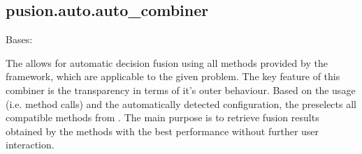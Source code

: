 \documentclass[letterpaper,10pt,english]{sphinxmanual}
\begin{document}
\subsection{pusion.auto.auto\_combiner}
\label{\detokenize{pusion.auto.auto_combiner:module-pusion.auto.auto_combiner}}\label{\detokenize{pusion.auto.auto_combiner:pusion-auto-auto-combiner}}\label{\detokenize{pusion.auto.auto_combiner:ac-cref}}\label{\detokenize{pusion.auto.auto_combiner::doc}}

\begin{fulllineitems}
\label{\detokenize{pusion.auto.auto_combiner:pusion.auto.auto_combiner.AutoCombiner}}
\sphinxAtStartPar
Bases: {\hyperref[\detokenize{pusion.auto.generic_combiner:pusion.auto.generic_combiner.GenericCombiner}]{}}

\sphinxAtStartPar
The  allows for automatic decision fusion using all methods provided by the framework, which are
applicable to the given problem. The key feature of this combiner is the transparency in terms of it’s outer
behaviour. Based on the usage (i.e. method calls) and the automatically detected configuration,
the  preselects all compatible methods from . The main purpose is to retrieve fusion
results obtained by the methods with the best performance without further user interaction.


\end{fulllineitems}
\end{document}
